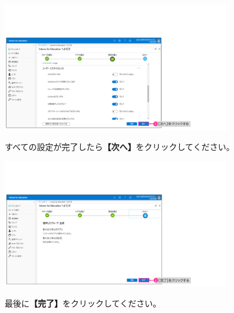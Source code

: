 \begin{figure}[h]
    \begin{minipage}{0.6\textwidth}
        \vspace{-1cm}
        \includegraphics[width=10cm]{figures/Setup-Intune-13.png}
    \end{minipage}
    \begin{minipage}{0.4\textwidth}
        すべての設定が完了したら\textbf{【次へ】}をクリックしてください。
    \end{minipage}
\end{figure}

\begin{figure}[h]
    \begin{minipage}{0.6\textwidth}
        \vspace{-1cm}
        \includegraphics[width=10cm]{figures/Setup-Intune-14.png}
    \end{minipage}
    \begin{minipage}{0.4\textwidth}
        最後に\textbf{【完了】}をクリックしてください。
    \end{minipage}
\end{figure}

